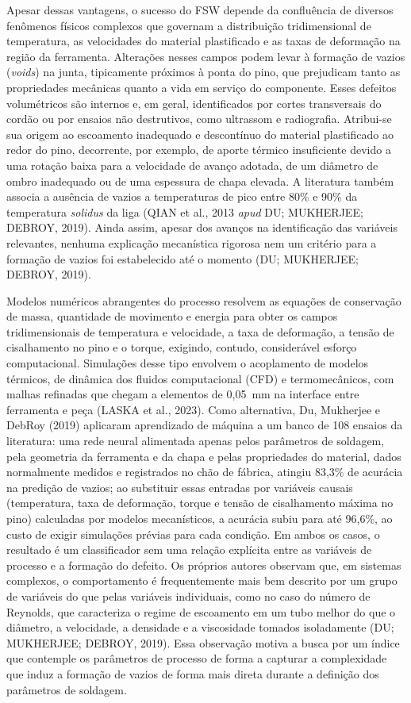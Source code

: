 \documentclass[12pt,openany]{report}
\begin{document}
Apesar dessas vantagens, o sucesso do FSW depende da confluência de diversos fenômenos físicos complexos que governam a distribuição tridimensional de temperatura, as velocidades do material plastificado e as taxas de deformação na região da ferramenta. Alterações nesses campos podem levar à formação de vazios (\textit{voids}) na junta, tipicamente próximos à ponta do pino, que prejudicam tanto as propriedades mecânicas quanto a vida em serviço do componente. Esses defeitos volumétricos são internos e, em geral, identificados por cortes transversais do cordão ou por ensaios não destrutivos, como ultrassom e radiografia. Atribui-se sua origem ao escoamento inadequado e descontínuo do material plastificado ao redor do pino, decorrente, por exemplo, de aporte térmico insuficiente devido a uma rotação baixa para a velocidade de avanço adotada, de um diâmetro de ombro inadequado ou de uma espessura de chapa elevada. A literatura também associa a ausência de vazios a temperaturas de pico entre 80\% e 90\% da temperatura \textit{solidus} da liga (QIAN et al., 2013 \textit{apud} DU; MUKHERJEE; DEBROY, 2019). Ainda assim, apesar dos avanços na identificação das variáveis relevantes, nenhuma explicação mecanística rigorosa nem um critério para a formação de vazios foi estabelecido até o momento (DU; MUKHERJEE; DEBROY, 2019).

Modelos numéricos abrangentes do processo resolvem as equações de conservação de massa, quantidade de movimento e energia para obter os campos tridimensionais de temperatura e velocidade, a taxa de deformação, a tensão de cisalhamento no pino e o torque, exigindo, contudo, considerável esforço computacional. Simulações desse tipo envolvem o acoplamento de modelos térmicos, de dinâmica dos fluidos computacional (CFD) e termomecânicos, com malhas refinadas que chegam a elementos de 0,05~mm na interface entre ferramenta e peça (LASKA et al., 2023). Como alternativa, Du, Mukherjee e DebRoy (2019) aplicaram aprendizado de máquina a um banco de 108 ensaios da literatura: uma rede neural alimentada apenas pelos parâmetros de soldagem, pela geometria da ferramenta e da chapa e pelas propriedades do material, dados normalmente medidos e registrados no chão de fábrica, atingiu 83,3\% de acurácia na predição de vazios; ao substituir essas entradas por variáveis causais (temperatura, taxa de deformação, torque e tensão de cisalhamento máxima no pino) calculadas por modelos mecanísticos, a acurácia subiu para até 96,6\%, ao custo de exigir simulações prévias para cada condição. Em ambos os casos, o resultado é um classificador sem uma relação explícita entre as variáveis de processo e a formação do defeito. Os próprios autores observam que, em sistemas complexos, o comportamento é frequentemente mais bem descrito por um grupo de variáveis do que pelas variáveis individuais, como no caso do número de Reynolds, que caracteriza o regime de escoamento em um tubo melhor do que o diâmetro, a velocidade, a densidade e a viscosidade tomados isoladamente (DU; MUKHERJEE; DEBROY, 2019). Essa observação motiva a busca por um índice que contemple os parâmetros de processo de forma a capturar a complexidade que induz a formação de vazios de forma mais direta durante a definição dos parâmetros de soldagem.
\end{document}
